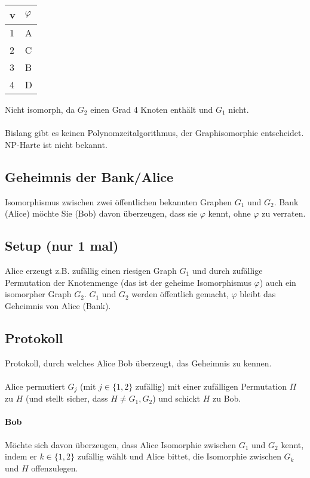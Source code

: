 \begin{tabular}{l|l}
	v & $\varphi$ \\
	\hline
	1 & A \\
	2 & C \\
	3 & B \\
	4 & D \\
\end{tabular}

Nicht isomorph, da $G_2$ einen Grad 4 Knoten enthält und $G_1$ nicht.

\paragraph*{} Bislang gibt es keinen Polynomzeitalgorithmus, der Graphisomorphie entscheidet. NP-Harte ist nicht bekannt.

\subsection{Geheimnis der Bank/Alice} Isomorphismus zwischen zwei öffentlichen bekannten Graphen $G_1$ und $G_2$. Bank (Alice) möchte Sie (Bob) davon überzeugen, dass sie $\varphi$ kennt, ohne $\varphi$ zu verraten.

\subsection{Setup (nur 1 mal)}
Alice erzeugt z.B. zufällig einen riesigen Graph $G_1$  und durch zufällige Permutation der Knotenmenge (das ist der geheime Isomorphismus $\varphi$) auch ein isomorpher Graph $G_2$. $G_1$ und $G_2$ werden öffentlich gemacht, $\varphi$ bleibt das Geheimnis von Alice (Bank).

\subsection{Protokoll}
Protokoll, durch welches Alice Bob überzeugt, das Geheimnis zu kennen.

\paragraph*{} Alice permutiert $G_j$ (mit $j \in \{ 1,2 \}$ zufällig) mit einer zufälligen Permutation $\Pi$ zu $H$ (und stellt sicher, dass $H \not= G_1,G_2$) und schickt $H$ zu Bob.

\paragraph*{Bob} Möchte sich davon überzeugen, dass Alice Isomorphie zwischen $G_1$ und $G_2$ kennt, indem er $k \in \{ 1,2 \}$ zufällig wählt und Alice bittet, die Isomorphie zwischen $G_k$ und $H$ offenzulegen.

